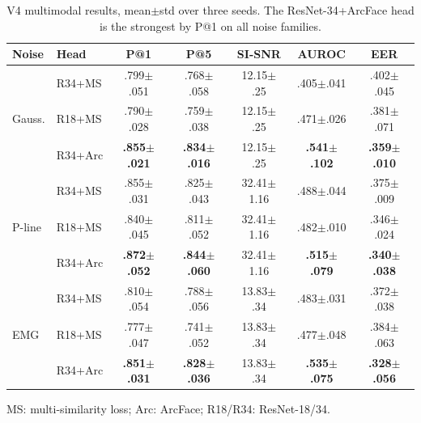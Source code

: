 \documentclass[conference,a4paper]{APSIPA2026}
\begin{document}
\begin{table}[t]
\centering
\caption{V4 multimodal results, mean$\pm$std over three seeds. The
ResNet-34+ArcFace head is the strongest by P@1 on all noise families.}
\label{tab:v4}
\begin{threeparttable}
\scriptsize
\setlength{\tabcolsep}{2.2pt}
\begin{tabular}{l l c c c c c}
\toprule
\textbf{Noise} & \textbf{Head} & \textbf{P@1} & \textbf{P@5}
& \textbf{SI-SNR} & \textbf{AUROC} & \textbf{EER} \\
\midrule
\multirow{3}{*}{Gauss.}
 & R34+MS  & .799$\pm$.051 & .768$\pm$.058 & 12.15$\pm$.25 & .405$\pm$.041 & .402$\pm$.045 \\
 & R18+MS  & .790$\pm$.028 & .759$\pm$.038 & 12.15$\pm$.25 & .471$\pm$.026 & .381$\pm$.071 \\
 & R34+Arc & \textbf{.855$\pm$.021} & \textbf{.834$\pm$.016} & 12.15$\pm$.25 & \textbf{.541$\pm$.102} & \textbf{.359$\pm$.010} \\
\midrule
\multirow{3}{*}{P-line}
 & R34+MS  & .855$\pm$.031 & .825$\pm$.043 & 32.41$\pm$1.16 & .488$\pm$.044 & .375$\pm$.009 \\
 & R18+MS  & .840$\pm$.045 & .811$\pm$.052 & 32.41$\pm$1.16 & .482$\pm$.010 & .346$\pm$.024 \\
 & R34+Arc & \textbf{.872$\pm$.052} & \textbf{.844$\pm$.060} & 32.41$\pm$1.16 & \textbf{.515$\pm$.079} & \textbf{.340$\pm$.038} \\
\midrule
\multirow{3}{*}{EMG}
 & R34+MS  & .810$\pm$.054 & .788$\pm$.056 & 13.83$\pm$.34 & .483$\pm$.031 & .372$\pm$.038 \\
 & R18+MS  & .777$\pm$.047 & .741$\pm$.052 & 13.83$\pm$.34 & .477$\pm$.048 & .384$\pm$.063 \\
 & R34+Arc & \textbf{.851$\pm$.031} & \textbf{.828$\pm$.036} & 13.83$\pm$.34 & \textbf{.535$\pm$.075} & \textbf{.328$\pm$.056} \\
\bottomrule
\end{tabular}
\begin{tablenotes}\footnotesize
\item MS: multi-similarity loss; Arc: ArcFace; R18/R34: ResNet-18/34.
\end{tablenotes}
\end{threeparttable}
\end{table}
\end{document}

